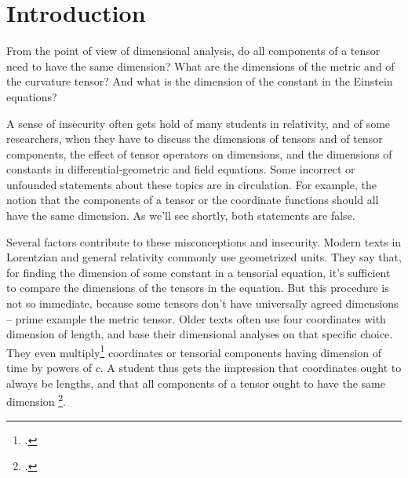 \documentclass[\ifafour a4paper,12pt,\else a5paper,10pt,\fi%
onecolumn,oneside,article,%
british%
]{memoir}
\theoremstyle{remark}
\theoremstyle{innote}
\newcommand*{\citep}{\footcites}
\renewcommand*{\|}[1][]{\nonscript\,#1\vert\nonscript\;\mathopen{}}
\newcommand*{\sect}{\S}%
\newcommand*{\eqn}{eq.}%
\newcommand*{\eg}{{e.g.}}
\begin{document}

\section{Introduction}
\label{sec:intro}


From the point of view of dimensional analysis, do all components of a
tensor need to have the same dimension? What are the dimensions of the
metric and of the curvature tensor? And what is the dimension of the
constant in the Einstein equations?

A sense of insecurity often gets hold of many students in relativity, and
of some researchers, when they have to discuss the dimensions of tensors
and of tensor components, the effect of tensor operators on dimensions, and
the dimensions of constants in differential-geometric and field equations.
Some incorrect or unfounded statements about these topics are in
circulation. For example, the notion that the components of a tensor or the
coordinate functions should all have the same dimension. As we'll see
shortly, both statements are false.

Several factors contribute to these misconceptions and insecurity. Modern
texts in Lorentzian and general relativity commonly use geometrized units.
They say that, for finding the dimension of some constant in a tensorial
equation, it's sufficient to compare the dimensions of the tensors in the
equation. But this procedure is not so immediate, because some tensors
don't have universally agreed dimensions -- prime example the metric
tensor. Older texts often use four coordinates with dimension of length,
and base their dimensional analyses on that specific choice. They even
multiply\citep[\eg][p.~72 \eqn~(37.8)]{tolman1934_t1949}[p.~80
\eqn~(32.15)]{landauetal1939_t1996}[p.~332
\eqn~(10.15)]{adleretal1965_r1975} coordinates or tensorial components
having dimension of time by powers of $c$. A student thus gets the
impression that coordinates ought to always be lengths, and that all
components of a tensor ought to have the same dimension \citep[A recent
work explicitly stating, if only in passing, that this needs not be the
case is][\sect~X]{kitano2013}.

\medskip
\end{document}
